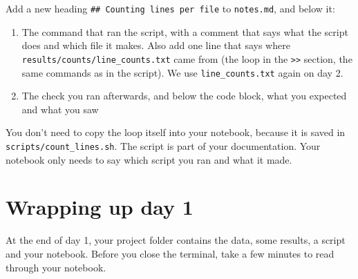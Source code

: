 \documentclass[
  letterpaper,
  DIV=11,
  numbers=noendperiod]{scrreprt}
\providecommand{\tightlist}{%
  \setlength{\itemsep}{0pt}\setlength{\parskip}{0pt}}
\begin{document}
\begin{tcolorbox}[enhanced jigsaw, coltitle=black, breakable, titlerule=0mm, colback=white, rightrule=.15mm, bottomrule=.15mm, toprule=.15mm, colframe=quarto-callout-color-frame, colbacktitle=quarto-callout-color!10!white, bottomtitle=1mm, opacitybacktitle=0.6, toptitle=1mm, leftrule=.75mm, arc=.35mm, title=\textcolor{quarto-callout-color}{\faInfo}\hspace{0.5em}{Notebook checkpoint: Counting lines per file}, left=2mm, opacityback=0]

Add a new heading \texttt{\#\#\ Counting\ lines\ per\ file} to
\texttt{notes.md}, and below it:

\begin{enumerate}
\def\labelenumi{\arabic{enumi}.}
\tightlist
\item
  The command that ran the script, with a comment that says what the
  script does and which file it makes. Also add one line that says where
  \texttt{results/counts/line\_counts.txt} came from (the loop in the
  \texttt{\textgreater{}\textgreater{}} section, the same commands as in
  the script). We use \texttt{line\_counts.txt} again on day 2.
\item
  The check you ran afterwards, and below the code block, what you
  expected and what you saw
\end{enumerate}

You don't need to copy the loop itself into your notebook, because it is
saved in \texttt{scripts/count\_lines.sh}. The script is part of your
documentation. Your notebook only needs to say which script you ran and
what it made.

\end{tcolorbox}

\section{Wrapping up day 1}\label{wrapping-up-day-1}

At the end of day 1, your project folder contains the data, some
results, a script and your notebook. Before you close the terminal, take
a few minutes to read through your notebook.
\end{document}
